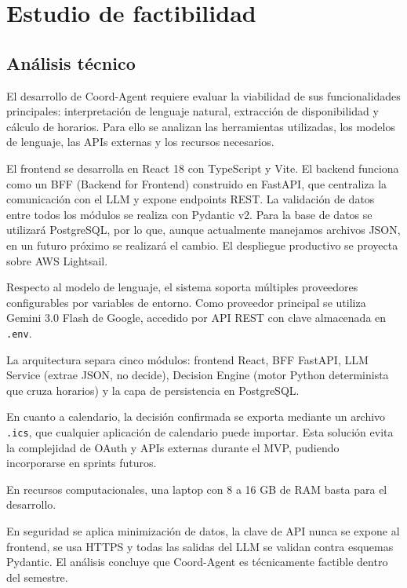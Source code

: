 \section{Estudio de factibilidad}

\subsection{Análisis técnico}

El desarrollo de Coord-Agent requiere evaluar la viabilidad de sus funcionalidades principales: interpretación de lenguaje natural, extracción de disponibilidad y cálculo de horarios. Para ello se analizan las herramientas utilizadas, los modelos de lenguaje, las APIs externas y los recursos necesarios.

El frontend se desarrolla en React 18 con TypeScript y Vite. El backend funciona como un BFF (Backend for Frontend) construido en FastAPI, que centraliza la comunicación con el LLM y expone endpoints REST. La validación de datos entre todos los módulos se realiza con Pydantic v2. Para la base de datos se utilizará PostgreSQL, por lo que, aunque actualmente manejamos archivos JSON, en un futuro próximo se realizará el cambio. El despliegue productivo se proyecta sobre AWS Lightsail.

Respecto al modelo de lenguaje, el sistema soporta múltiples proveedores configurables por variables de entorno. Como proveedor principal se utiliza Gemini 3.0 Flash de Google, accedido por API REST con clave almacenada en \texttt{.env}.

La arquitectura separa cinco módulos: frontend React, BFF FastAPI, LLM Service (extrae JSON, no decide), Decision Engine (motor Python determinista que cruza horarios) y la capa de persistencia en PostgreSQL.

En cuanto a calendario, la decisión confirmada se exporta mediante un archivo \texttt{.ics}, que cualquier aplicación de calendario puede importar. Esta solución evita la complejidad de OAuth y APIs externas durante el MVP, pudiendo incorporarse en sprints futuros.

En recursos computacionales, una laptop con 8 a 16 GB de RAM basta para el desarrollo.

En seguridad se aplica minimización de datos, la clave de API nunca se expone al frontend, se usa HTTPS y todas las salidas del LLM se validan contra esquemas Pydantic. El análisis concluye que Coord-Agent es técnicamente factible dentro del semestre.



